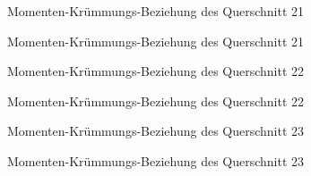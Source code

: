 \documentclass[
  11pt,
  letterpaper,
]{scrreprt}
\begin{document}
\begin{figure}[H]


\caption{\label{fig-qs_21}Momenten-Krümmungs-Beziehung des Querschnitt
21}

\end{figure}%

\begin{figure}[H]


\caption{\label{fig-m_chi_21}Momenten-Krümmungs-Beziehung des
Querschnitt 21}

\end{figure}%

\begin{figure}[H]


\caption{\label{fig-qs_22}Momenten-Krümmungs-Beziehung des Querschnitt
22}

\end{figure}%

\begin{figure}[H]


\caption{\label{fig-m_chi_22}Momenten-Krümmungs-Beziehung des
Querschnitt 22}

\end{figure}%

\begin{figure}[H]


\caption{\label{fig-qs_23}Momenten-Krümmungs-Beziehung des Querschnitt
23}

\end{figure}%

\begin{figure}[H]


\caption{\label{fig-m_chi_23}Momenten-Krümmungs-Beziehung des
Querschnitt 23}

\end{figure}%
\end{document}
